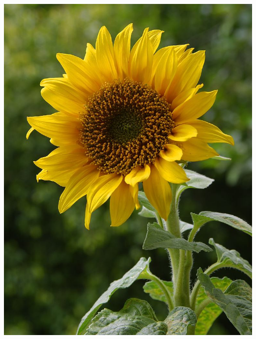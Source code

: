 \documentclass{article}
\begin{document}
\begin{center}
\includegraphics[height=0.9\textheight, angle=90]{../Sunflower.jpg}
\end{center}
\newpage
\end{document}
